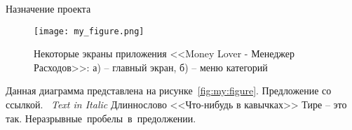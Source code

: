 \subsubsection{} Назначение проекта
\label{sec:analysis:specification:purpose}


\begin{figure}[H]
    \centering
    \texttt{[image: my\_figure.png]}
    \caption{Некоторые экраны приложения <<Money Lover - Менеджер Расходов>>: а) -- главный экран, б) -- меню категорий}
    \label{fig:analysis:analogues:money_lover}
\end{figure}


Данная диаграмма представлена на рисунке~\ref{fig:my:figure}.
Предложение со ссылкой.~\cite{bib_name}
\emph{Text in Italic}
Длин\-но\-сло\-во
\linebreak
<<Что-нибудь в кавычках>>
Тире -- это так.
Неразрывные~пробелы~в~предолжении.